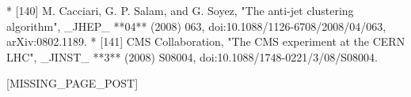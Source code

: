 * [140] M. Cacciari, G. P. Salam, and G. Soyez, "The anti-jet clustering algorithm", _JHEP_ **04** (2008) 063, doi:10.1088/1126-6708/2008/04/063, arXiv:0802.1189.
* [141] CMS Collaboration, "The CMS experiment at the CERN LHC", _JINST_ **3** (2008) S08004, doi:10.1088/1748-0221/3/08/S08004.

[MISSING_PAGE_POST]

 